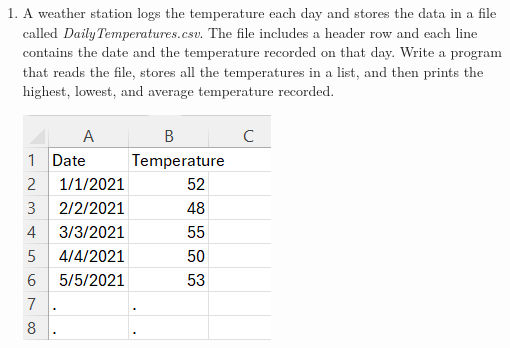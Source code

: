 \documentclass{article}
\begin{document}
\begin{enumerate}
	\item 
		A weather station logs the temperature each day and stores the data in a file called \textit{DailyTemperatures.csv}.  
		The file includes a header row and each line contains the date and the temperature recorded on that day.  
		Write a program that reads the file, stores all the temperatures in a list, and then prints the highest, lowest, and average temperature recorded.
		
		\begin{flushright}
			\includegraphics[scale=.65]{imgs/DailyTemperaturesData.PNG}
		\end{flushright}




\end{enumerate}
\end{document}
